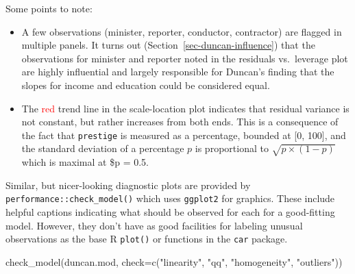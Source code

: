 \documentclass[
  letterpaper,
  10pt,
  krantz2]{krantz}
\makeatletter
\newenvironment{Shaded}{\begin{snugshade}}{\end{snugshade}}
\newcommand{\AttributeTok}[1]{\textcolor[rgb]{0.40,0.45,0.13}{#1}}
\newcommand{\FunctionTok}[1]{\textcolor[rgb]{0.28,0.35,0.67}{#1}}
\newcommand{\NormalTok}[1]{\textcolor[rgb]{0.00,0.23,0.31}{#1}}
\newcommand{\StringTok}[1]{\textcolor[rgb]{0.13,0.47,0.30}{#1}}
\providecommand{\tightlist}{%
  \setlength{\itemsep}{0pt}\setlength{\parskip}{0pt}}\usepackage{longtable,booktabs,array}
\newenvironment{kframe}{%
  \medskip{}
  \setlength{\fboxsep}{.8em}
  \def\at@end@of@kframe{}%
  \ifinner\ifhmode%
  \def\at@end@of@kframe{\end{minipage}}%
  \begin{minipage}{\columnwidth}%
  \fi\fi%
  \def\FrameCommand##1{\hskip\@totalleftmargin \hskip-\fboxsep
  \colorbox{shadecolor}{##1}\hskip-\fboxsep
      \hskip-\linewidth \hskip-\@totalleftmargin \hskip\columnwidth}%
  \MakeFramed {\advance\hsize-\width
    \@totalleftmargin\z@ \linewidth\hsize
    \@setminipage}}%
{\par\unskip\endMakeFramed%
  \at@end@of@kframe}
\renewenvironment{Shaded}{\begin{kframe}}{\end{kframe}}
\makeatother
\begin{document}
Some points to note:

\begin{itemize}
\tightlist
\item
  A few observations (minister, reporter, conductor, contractor) are
  flagged in multiple panels. It turns out
  (Section~\ref{sec-duncan-influence}) that the observations for
  minister and reporter noted in the residuals vs.~leverage plot are
  highly influential and largely responsible for Duncan's finding that
  the slopes for income and education could be considered equal.
\item
  The \textcolor{red}{red} trend line in the scale-location plot
  indicates that residual variance is not constant, but rather increases
  from both ends. This is a consequence of the fact that
  \texttt{prestige} is measured as a percentage, bounded at {[}0,
  100{]}, and the standard deviation of a percentage \(p\) is
  proportional to \(\sqrt{p \times (1-p)}\) which is maximal at \$p =
  0.5.
\end{itemize}

Similar, but nicer-looking diagnostic plots are provided by
\texttt{performance::check\_model()} which uses \texttt{ggplot2} for
graphics. These include helpful captions indicating what should be
observed for each for a good-fitting model. However, they don't have as
good facilities for labeling unusual observations as the base R
\texttt{plot()} or functions in the \texttt{car} package.

\begin{Shaded}
\begin{Highlighting}[]
\FunctionTok{check\_model}\NormalTok{(duncan.mod, }\AttributeTok{check=}\FunctionTok{c}\NormalTok{(}\StringTok{"linearity"}\NormalTok{, }\StringTok{"qq"}\NormalTok{, }\StringTok{"homogeneity"}\NormalTok{, }\StringTok{"outliers"}\NormalTok{))}
\end{Highlighting}
\end{Shaded}
\end{document}
